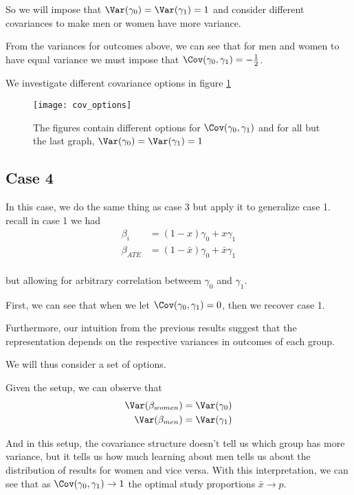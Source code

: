 So we will impose that $\Var(\gamma_0) = \Var(\gamma_1) = 1$ and consider different covariances to make men or women have more variance.

From the variances for outcomes above, we can see that for men and women to have equal variance we must impose that  $\Cov(\gamma_0, \gamma_1) = -\frac{1}{2}$.

We investigate different covariance options in figure \ref{fig:cov_options}

\begin{figure}[btp]
	\centering
	\texttt{[image: cov\_options]}
	\caption{The figures contain different options for $\Cov(\gamma_0, \gamma_1)$ and for all but the last graph, $\Var(\gamma_0) = \Var(\gamma_1) = 1$} 
	\label{fig:cov_options}
\end{figure}

\subsection*{Case 4}

In this case, we do the same thing as case 3 but apply it to generalize case 1. recall in case 1 we had
\begin{align*}
	\beta_i &=  (1-x)\gamma_0 + x \gamma_1 \\
	\beta_{ATE} &=  (1 - \bar{x})\gamma_0 + \bar{x} \gamma_1 \\
\end{align*}

but allowing for arbitrary correlation betweem $\gamma_0$ and $\gamma_1$.

First, we can see that when we let  $\Cov(\gamma_0, \gamma_1) = 0$, then we recover case 1.

Furthermore, our intuition from the previous results suggest that the representation depends on the respective variances in outcomes of each group.

We will thus consider a set of options.

Given the setup, we can observe that
\begin{align*}
	\Var(\beta_{women}) &= \Var(\gamma_0) \\
	\Var(\beta_{men}) &= \Var(\gamma_1)
\end{align*} 

And in this setup, the covariance structure doesn't tell us which group has more variance, but it tells us how much learning about men tells us about the distribution of results for women and vice versa. 
With this interpretation, we can see that as $\Cov(\gamma_0, \gamma_1) \to 1$ the optimal study proportions $\bar{x} \to p$.

